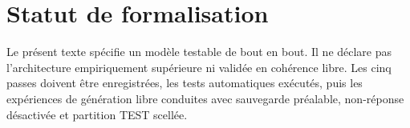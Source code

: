 \documentclass[11pt,a4paper]{report}
\begin{document}
\chapter*{Statut de formalisation}
Le présent texte spécifie un modèle testable de bout en bout. Il ne déclare pas l'architecture empiriquement supérieure ni validée en cohérence libre. Les cinq passes doivent être enregistrées, les tests automatiques exécutés, puis les expériences de génération libre conduites avec sauvegarde préalable, non-réponse désactivée et partition TEST scellée.
\end{document}
